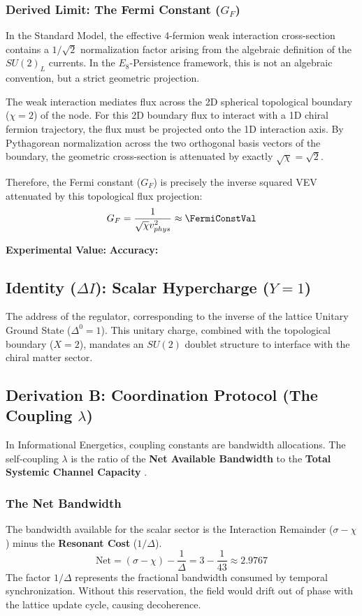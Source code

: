 \subsubsection{Derived Limit: The Fermi Constant (\texorpdfstring{$G_F$}{GF})}
In the Standard Model, the effective 4-fermion weak interaction cross-section contains a $1/\sqrt{2}$ normalization factor arising from the algebraic definition of the $SU(2)_L$ currents. In the $E_8$-Persistence framework, this is not an algebraic convention, but a strict geometric projection.

The weak interaction mediates flux across the 2D spherical topological boundary ($\chi=2$) of the node. For this 2D boundary flux to interact with a 1D chiral fermion trajectory, the flux must be projected onto the 1D interaction axis. By Pythagorean normalization across the two orthogonal basis vectors of the boundary, the geometric cross-section is attenuated by exactly $\sqrt{\chi} = \sqrt{2}$. 

Therefore, the Fermi constant ($G_F$) is precisely the inverse squared VEV attenuated by this topological flux projection:
\begin{equation}
    G_F = \frac{1}{\sqrt{\chi}v_{phys}^2} \approx \mathbf{\FermiConstVal}
\end{equation}

\textbf{Experimental Value:} \FermiConstExperimentalValue
\textbf{Accuracy:} \FermiConstAccText

\subsection{Identity (\texorpdfstring{$\Delta I$}{DeltaI}): Scalar Hypercharge (\texorpdfstring{$Y=1$}{Y1})} 
The address of the regulator, corresponding to the inverse of the lattice Unitary Ground State ($\Delta^0 =1$). This unitary charge, combined with the topological boundary ($X=2$), mandates an $SU(2)$ doublet structure to interface with the chiral matter sector.


\subsection{Derivation B: Coordination Protocol (The Coupling \texorpdfstring{$\lambda$}{lambda})}
In Informational Energetics, coupling constants are bandwidth allocations. The self-coupling $\lambda$ is the ratio of the \textbf{Net Available Bandwidth} to the \textbf{Total Systemic Channel Capacity} .

\subsubsection{The Net Bandwidth}
The bandwidth available for the scalar sector is the Interaction Remainder ($\sigma - \chi$) minus the \textbf{Resonant Cost} ($1/\Delta$).
\begin{equation}
\text{Net} = (\sigma - \chi) - \frac{1}{\Delta} = 3 - \frac{1}{43} \approx 2.9767
\end{equation}
The factor $1/\Delta$ represents the fractional bandwidth consumed by temporal synchronization. Without this reservation, the field would drift out of phase with the lattice update cycle, causing decoherence.

